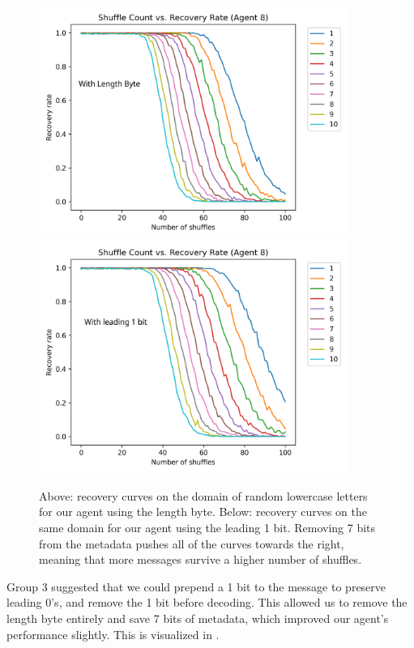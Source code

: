 \documentclass[titlepage]{article}
\begin{document}
\begin{figure}
    \centering
    \includegraphics[width=0.9\textwidth]{figures/length_byte.png}
    \includegraphics[width=0.9\textwidth]{figures/leading_1.png}
    \caption{Above: recovery curves on the domain of random lowercase letters for our agent using the length byte. Below: recovery curves on the same domain for our agent using the leading 1 bit. Removing 7 bits from the metadata pushes all of the curves towards the right, meaning that more messages survive a higher number of shuffles.}
    \label{fig:no_length_byte}
\end{figure}

Group 3 suggested that we could prepend a 1 bit to the message to preserve leading 0's, and remove the 1 bit before decoding. This allowed us to remove the length byte entirely and save 7 bits of metadata, which improved our agent's performance slightly. This is visualized in .
\end{document}
